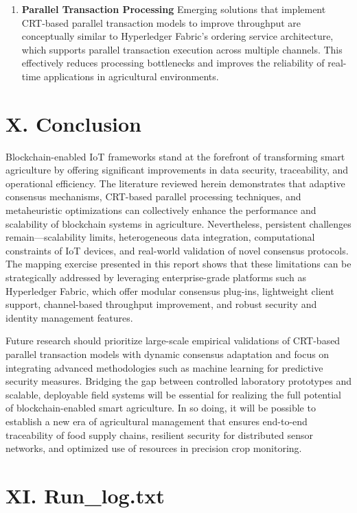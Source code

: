 \documentclass[12pt,onecolumn]{IEEEtran} %
\begin{document}
\begin{enumerate}
\item \textbf{Parallel Transaction Processing}  
   Emerging solutions that implement CRT-based parallel transaction models to improve throughput \cite{ali2022blockchainenabledarchitecture} are conceptually similar to Hyperledger Fabric's ordering service architecture, which supports parallel transaction execution across multiple channels. This effectively reduces processing bottlenecks and improves the reliability of real-time applications in agricultural environments.
\end{enumerate}

\section*{X. Conclusion}

Blockchain-enabled IoT frameworks stand at the forefront of transforming smart agriculture by offering significant improvements in data security, traceability, and operational efficiency. The literature reviewed herein demonstrates that adaptive consensus mechanisms, CRT-based parallel processing techniques, and metaheuristic optimizations can collectively enhance the performance and scalability of blockchain systems in agriculture. Nevertheless, persistent challenges remain—scalability limits, heterogeneous data integration, computational constraints of IoT devices, and real-world validation of novel consensus protocols. The mapping exercise presented in this report shows that these limitations can be strategically addressed by leveraging enterprise-grade platforms such as Hyperledger Fabric, which offer modular consensus plug-ins, lightweight client support, channel-based throughput improvement, and robust security and identity management features.

Future research should prioritize large-scale empirical validations of CRT-based parallel transaction models with dynamic consensus adaptation and focus on integrating advanced methodologies such as machine learning for predictive security measures. Bridging the gap between controlled laboratory prototypes and scalable, deployable field systems will be essential for realizing the full potential of blockchain-enabled smart agriculture. In so doing, it will be possible to establish a new era of agricultural management that ensures end-to-end traceability of food supply chains, resilient security for distributed sensor networks, and optimized use of resources in precision crop monitoring.

\section*{XI. Run\_log.txt}
\end{document}
